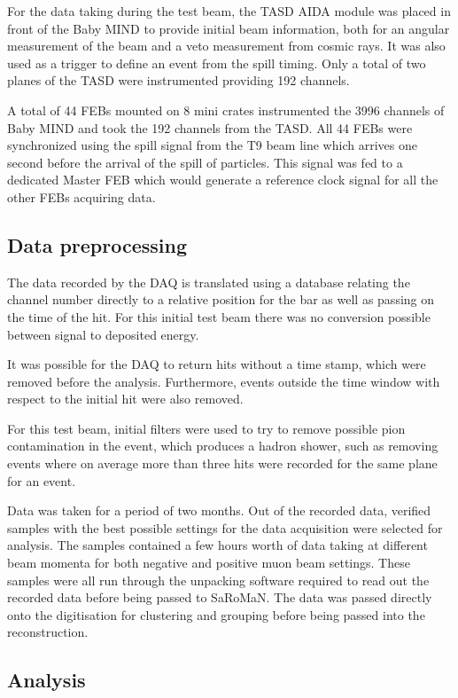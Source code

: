 For the data taking during the test beam, the TASD AIDA module was placed in front of the Baby MIND to provide initial beam information, both for an angular measurement of the beam and a veto measurement from cosmic rays. It was also used as a trigger to define an event from the spill timing. Only a total of two planes of the TASD were instrumented providing 192 channels. 

A total of 44 FEBs mounted on 8 mini crates instrumented the 3996 channels of Baby MIND and took the 192 channels from the TASD. All 44 FEBs were synchronized using the spill signal from the T9 beam line which arrives one second before the arrival of the spill of particles. This signal was fed to a dedicated Master FEB which would generate a reference clock signal for all the other FEBs acquiring data.

\subsection{Data preprocessing}
The data recorded by the DAQ is translated using a database relating the channel number directly to a relative position for the bar as well as passing on the time of the hit. For this initial test beam there was no conversion possible between signal to deposited energy.

It was possible for the DAQ to return hits without a time stamp, which were removed before the analysis. Furthermore, events outside the time window with respect to the initial hit were also removed.

For this test beam, initial filters were used to try to remove possible pion contamination in the event, which produces a hadron shower, such as removing events where on average more than three hits were recorded for the same plane for an event. 

Data was taken for a period of two months. Out of the recorded data, verified samples with the best possible settings for the data acquisition were selected for analysis. The samples contained a few hours worth of data taking at different beam momenta for both negative and positive muon beam settings. These samples were all run through the unpacking software required to read out the recorded data before being passed to SaRoMaN. The data was passed directly onto the digitisation for clustering and grouping before being passed into the reconstruction.

\subsection{Analysis}


